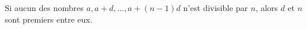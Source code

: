 Si aucun des nombres $a, a + d, \ldots, a + (n - 1)d$ n'est divisible par $n$, alors $d$ et $n$ sont premiers entre eux.
